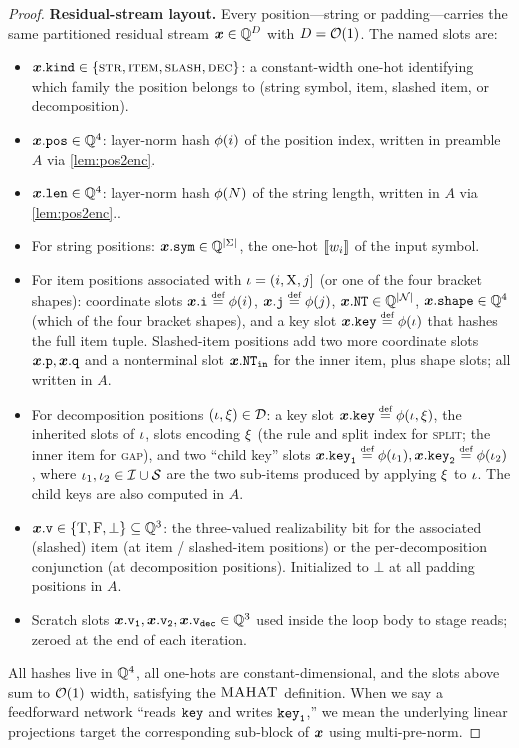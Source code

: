 \documentclass{article}
\begin{document}
\begin{proof}
    \textbf{Residual-stream layout.}
    Every position---string or padding---carries the same partitioned residual stream ${{{ \bm{x}}}} \in {{ \mathbb{Q}}}^{{{ D}}}$ with ${{ D}} = {{ \mathcal{O}}}(1)$.
    The named slots are:
    \begin{itemize}[noitemsep,topsep=0pt,leftmargin=15pt,parsep=0pt,partopsep=0pt]
        \item ${{{ \bm{x}}}}.{\mathtt{kind}} \in {{\{ \textsc{str}, \textsc{item}, \textsc{slash}, \textsc{dec} \}}}$: a constant-width one-hot identifying which family the position belongs to (string symbol, item, slashed item, or decomposition).
        \item ${{{ \bm{x}}}}.{\mathtt{pos}} \in {{ \mathbb{Q}}}^4$: layer-norm hash $\phi({{ i}})$ of the position index, written in preamble $A$ via \cref{lem:pos2enc}.
        \item ${{{ \bm{x}}}}.{\mathtt{len}} \in {{ \mathbb{Q}}}^4$: layer-norm hash $\phi({{ N}})$ of the string length, written in $A$ via \cref{lem:pos2enc}..
        \item For string positions: ${{{ \bm{x}}}}.{\mathtt{sym}} \in {{ \mathbb{Q}}}^{|{{ \Sigma}}|}$, the one-hot ${{ \llbracket{w}_{{ i}}\rrbracket}}$ of the input symbol.
        \item For item positions associated with ${{ \iota}} = ({{ i}}, {{ \mathrm{X}}}, {{ j}}]$ (or one of the four bracket shapes): coordinate slots $\vx.\fileft \defeq \phi(\idxi)$, $\vx.\firight \defeq \phi(\idxj)$, ${{{ \bm{x}}}}.{\mathtt{NT}} \in {{ \mathbb{Q}}}^{|{{ \mathcal{N}}}|}$, ${{{ \bm{x}}}}.{\mathtt{shape}} \in {{ \mathbb{Q}}}^4$ (which of the four bracket shapes), and a key slot $\vx.\fkeyself \defeq \phi(\itm)$ that hashes the full item tuple.
        Slashed-item positions add two more coordinate slots ${{{ \bm{x}}}}.{\mathtt{p}}, {{{ \bm{x}}}}.{\mathtt{q}}$ and a nonterminal slot ${{{ \bm{x}}}}.{\mathtt{NT}_\mathtt{in}}$ for the inner item, plus shape slots; all written in $A$.
        \item For decomposition positions $({{ \iota}}, {{\xi}}) \in {{\mathcal{D}}}$: a key slot $\vx.\fkeyself \defeq \phi(\itm, \decomp)$, the inherited slots of ${{ \iota}}$, slots encoding ${{\xi}}$ (the rule and split index for \textsc{split}; the inner item for \textsc{gap}), and two ``child key'' slots $\vx.\fkeychildone \defeq \phi(\itm_1), \vx.\fkeychildtwo \defeq \phi(\itm_2)$, where ${{ \iota}}_1, {{ \iota}}_2 \in {{\mathcal{I}}} \cup {{\mathcal{S}}}$ are the two sub-items produced by applying ${{\xi}}$ to ${{ \iota}}$. The child keys are also computed in $A$.
        \item ${{{ \bm{x}}}}.{\mathtt{v}} \in {{\{ {\mathbin{\mathrm{T}}}, {\mathbin{\mathrm{F}}}, \bot \}}} \subseteq {{ \mathbb{Q}}}^3$: the three-valued realizability bit for the associated (slashed) item (at item / slashed-item positions) or the per-decomposition conjunction (at decomposition positions). Initialized to $\bot$ at all padding positions in $A$.
        \item Scratch slots ${{{ \bm{x}}}}.{\mathtt{v}_\mathtt{1}}, {{{ \bm{x}}}}.{\mathtt{v}_\mathtt{2}}, {{{ \bm{x}}}}.{\mathtt{v}_\mathtt{dec}} \in {{ \mathbb{Q}}}^3$ used inside the loop body to stage reads; zeroed at the end of each iteration.
    \end{itemize}
    All hashes live in ${{ \mathbb{Q}}}^4$, all one-hots are constant-dimensional, and the slots above sum to ${{ \mathcal{O}}}(1)$ width, satisfying the ${{\textsc{MAHAT}}}$ definition.
    When we say a feedforward network ``reads ${\mathtt{key}}$ and writes ${\mathtt{key}_\mathtt{1}}$,'' we mean the underlying linear projections target the corresponding sub-block of ${{{ \bm{x}}}}$ using multi-pre-norm.
    

\end{proof}
\end{document}
